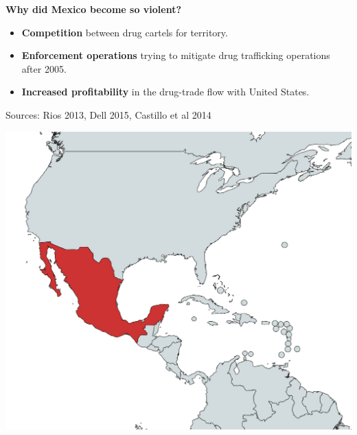 \documentclass[xcolor={dvipsnames}]{beamer}
\begin{document}
\begin{frame}
	\huge{
	\begin{center}
		\bf{Why did Mexico become so violent?}
	\end{center}
	}
	
	\pause
	
	\LARGE{
		\begin{itemize}
		
			\item \textbf{Competition} between drug cartels for territory. \pause
		
			\item \textbf{Enforcement operations} trying to mitigate drug trafficking operations after 2005. \pause
		
    	    \item \textbf{Increased profitability} in the drug-trade flow with United States. 
		
		\end{itemize}
		
	\tiny{Sources: Rios 2013, Dell 2015, Castillo et al 2014}
	}

\end{frame}



\begin{frame}

	\begin{center}
		\includegraphics[scale=.3]{Figures/Mexico1}
	\end{center}
				
\end{frame}
\end{document}
